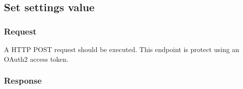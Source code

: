 


\subsection{Set settings value}
\label{subsec:set-settings-value}

\subsubsection{Request}

A HTTP POST request should be executed.
This endpoint is protect using an OAuth2 access token.




\subsubsection{Response}



